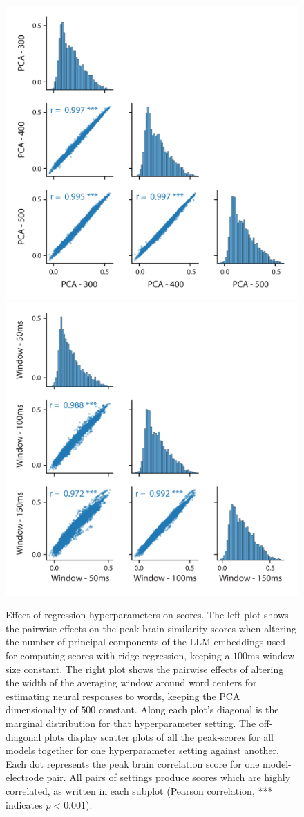 \begin{figure}[ht]
  {\includegraphics[width=0.47\linewidth]{supplementary_figures/Figure_supplemental_change_PCA-01.png}}
  {\includegraphics[width=0.47\linewidth]{supplementary_figures/Figure_supplemental_change_Window-01.png}}
  \caption{Effect of regression hyperparameters on scores. The left plot shows the pairwise effects on the peak brain similarity scores when altering the number of principal components of the LLM embeddings used for computing scores with ridge regression, keeping a $100$ms window size constant. The right plot shows the pairwise effects of altering the width of the averaging window around word centers for estimating neural responses to words, keeping the PCA dimensionality of $500$ constant. Along each plot’s diagonal is the marginal distribution for that hyperparameter setting. The off-diagonal plots display scatter plots of all the peak-scores for all models together for one hyperparameter setting against another. Each dot represents the peak brain correlation score for one model-electrode pair. All pairs of settings produce scores which are highly correlated, as written in each subplot (Pearson correlation, *** indicates $p<0.001$).}
  \label{fig:s2}
\end{figure}

